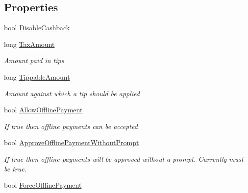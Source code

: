 \subsection*{Properties}
\begin{DoxyCompactItemize}
\item 
bool \hyperlink{classcom_1_1clover_1_1remotepay_1_1sdk_1_1_auth_request_acd92e15928d39787729933da4400ee6b}{Disable\+Cashback}
\item 
long \hyperlink{classcom_1_1clover_1_1remotepay_1_1sdk_1_1_auth_request_ad23ebdcb14edcb4eb99b0572350905c6}{Tax\+Amount}
\begin{DoxyCompactList}\small\item\em Amount paid in tips \end{DoxyCompactList}\item 
long \hyperlink{classcom_1_1clover_1_1remotepay_1_1sdk_1_1_auth_request_a2f3e3450ac6bc785023926590bf4c468}{Tippable\+Amount}
\begin{DoxyCompactList}\small\item\em Amount against which a tip should be applied \end{DoxyCompactList}\item 
bool \hyperlink{classcom_1_1clover_1_1remotepay_1_1sdk_1_1_auth_request_afaafa0e18fed556cc3cd6ca9906630b2}{Allow\+Offline\+Payment}
\begin{DoxyCompactList}\small\item\em If true then offline payments can be accepted \end{DoxyCompactList}\item 
bool \hyperlink{classcom_1_1clover_1_1remotepay_1_1sdk_1_1_auth_request_aa1e83e887f5d3db97e7ae9810bb63e08}{Approve\+Offline\+Payment\+Without\+Prompt}
\begin{DoxyCompactList}\small\item\em If true then offline payments will be approved without a prompt. Currently must be true. \end{DoxyCompactList}\item 
bool \hyperlink{classcom_1_1clover_1_1remotepay_1_1sdk_1_1_auth_request_ae60bb0644551b7c845472bfcef226de4}{Force\+Offline\+Payment}

\end{DoxyCompactItemize}
